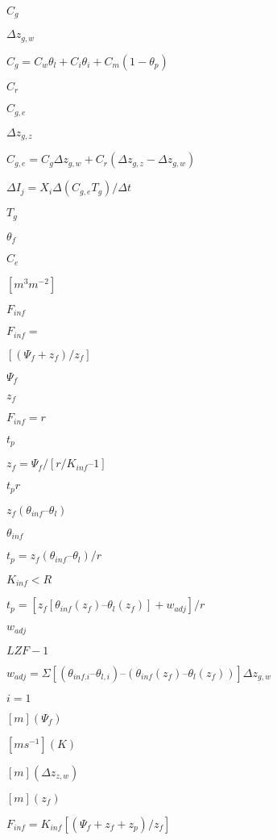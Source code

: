\documentclass{article}
\begin{document}
{$C_g$
\pagebreak

$\Delta z_{g,w}$
\pagebreak

$C_g = C_w \theta_l + C_i \theta_i + C_m (1 - \theta_p)$
\pagebreak

$C_r$
\pagebreak

$C_{g,e}$
\pagebreak

$\Delta z_{g,z}$
\pagebreak

$C_{g,e} = C_g \Delta z_{g,w} + C_r(\Delta z_{g,z} - \Delta z_{g,w})$
\pagebreak

$\Delta I_j = X_i \Delta (C_{g,e} T_g)/\Delta t$
\pagebreak

$T_g$
\pagebreak

$\theta_f$
\pagebreak

$C_e$
\pagebreak

$[m^3 m^{-2}]$
\pagebreak

$F_{inf}$
\pagebreak

$F_{inf} = $
\pagebreak

$ [(\Psi_f + z_f)/ z_f ]$
\pagebreak

$\Psi_f$
\pagebreak

$z_f$
\pagebreak

$F_{inf} = r$
\pagebreak

$t_p$
\pagebreak

$z_f = \Psi_f /[r/K_{inf} – 1]$
\pagebreak

$t_p r$
\pagebreak

$z_f (\theta_{inf} – \theta_l)$
\pagebreak

$\theta_{inf}$
\pagebreak

$t_p = z_f (\theta_{inf} – \theta_l)/r$
\pagebreak

$K_{inf} < R$
\pagebreak

$t_p = [z_f [\theta_{inf}(z_f) – \theta_l(z_f)] + w_{adj}]/r$
\pagebreak

$w_{adj}$
\pagebreak

$LZF-1$
\pagebreak

$w_{adj} = \Sigma[(\theta_{inf. i} – \theta_{l,i} ) – (\theta_{inf} (z_f) – \theta_l (z_f))] \Delta z_{g,w}$
\pagebreak

$i=1$
\pagebreak

$[m] (\Psi_f)$
\pagebreak

$[m s^{-1}] (K)$
\pagebreak

$[m] (\Delta z_{z,w})$
\pagebreak

$[m] (z_f)$
\pagebreak

$F_{inf} = K_{inf} [(\Psi_f + z_f + z_p)/z_f ]$
\pagebreak

}
\end{document}
